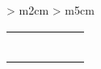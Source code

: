 \documentclass{article}
\begin{document}
\pagestyle{empty}
\begin{landscape}

  \newcolumntype{D}    { >{\centering\arraybackslash} m{2cm} }
  \newcolumntype{H}    { >{\centering\arraybackslash} m{5cm} }
  
  \begin{center}
    \begin{tabular}{|D||H|H||H|H|X}\hline
      & \hourone{} & \hourtwo{} & \hourthree{} & \hourfour{} &\\[1cm]\hline
      \lundi{} & \lundione{} & \lunditwo{} & \lundithree{} & \lundifour{} &\\[1.5cm]\hline
\mardi{} & \mardione{} & \marditwo{} & \mardithree{} & \mardifour{} &\\[1.5cm]\hline
\mercredi{} & \mercredione{} & \mercreditwo{} & \mercredithree{} & \mercredifour{} &\\[1.5cm]\hline
\jeudi{} & \jeudione{} & \jeuditwo{} & \jeudithree{} & \jeudifour{} &\\[1.5cm]\hline
\vendredi{} & \vendredione{} & \vendreditwo{} & \vendredithree{} & \vendredifour{} &\\[1.5cm]\hline
\samedi{} & \samedione{} & \sameditwo{} & \samedithree{} & \samedifour{} &\\[1.5cm]\hline
    \end{tabular}
  \end{center}
\end{landscape}
\end{document}
